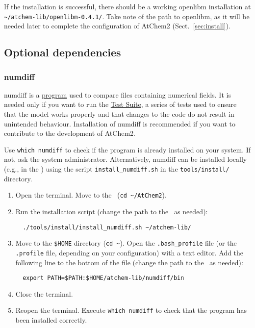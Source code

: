 If the installation is successful, there should be a working openlibm
installation at \texttt{\textasciitilde/atchem-lib/openlibm-0.4.1/}.
Take note of the path to openlibm, as it will be needed later to
complete the configuration of AtChem2 (Sect.~\ref{sec:install}).

\subsection{Optional dependencies} \label{subsec:optional-dependencies}

\subsubsection{numdiff}

numdiff is a \href{https://www.nongnu.org/numdiff/}{program} used to
compare files containing numerical fields. It is needed only if you
want to run the \hyperref[sec:test-suite]{Test Suite}, a series of
tests used to ensure that the model works properly and that changes to
the code do not result in unintended behaviour. Installation of
numdiff is recommended if you want to contribute to the development of
AtChem2.

Use \verb|which numdiff| to check if the program is already installed
on your system. If not, ask the system administrator. Alternatively,
numdiff can be installed locally (e.g., in the \depdir) using the
script \texttt{install\_numdiff.sh} in the \texttt{tools/install/}
directory.

\begin{enumerate}
\item Open the terminal. Move to the \maindir\ (\verb|cd ~/AtChem2|).
\item Run the installation script (change the path to the \depdir\ as
  needed):
  \begin{verbatim}
  ./tools/install/install_numdiff.sh ~/atchem-lib/
  \end{verbatim}
\item Move to the \texttt{\$HOME} directory (\texttt{cd\ \textasciitilde}).
  Open the \texttt{.bash\_profile} file (or the \texttt{.profile}
  file, depending on your configuration) with a text editor. Add the
  following line to the bottom of the file (change the path to the
  \depdir\ as needed):
  \begin{verbatim}
  export PATH=$PATH:$HOME/atchem-lib/numdiff/bin
  \end{verbatim}
\item Close the terminal.
\item Reopen the terminal. Execute \verb|which numdiff| to check that
  the program has been installed correctly.
\end{enumerate}

